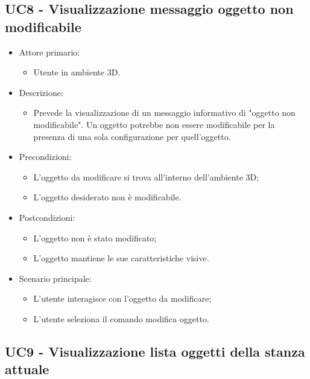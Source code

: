 \subsection{UC8 - Visualizzazione messaggio oggetto non modificabile}

\begin{itemize}

	\item Attore primario: 
	\begin{itemize}
		\item Utente in ambiente 3D.
	\end{itemize}
	\item Descrizione:
	\begin{itemize}
		\item Prevede la visualizzazione di un messaggio informativo di "oggetto non modificabile".
\newline Un oggetto potrebbe non essere modificabile per la presenza di una sola configurazione per quell'oggetto.
	\end{itemize}
	
	\item Precondizioni:
	\begin{itemize}
		\item L'oggetto da modificare si trova all'interno dell'ambiente 3D;
		\item L'oggetto desiderato non è modificabile.
	\end{itemize}
	
	\item Postcondizioni:
	\begin{itemize}
		\item L'oggetto non è stato modificato;
		\item L'oggetto mantiene le sue caratteristiche visive.
	\end{itemize}
	
	\item Scenario principale:
	\begin{itemize}
		\item L'utente interagisce con l'oggetto da modificare;
		\item L'utente seleziona il comando modifica oggetto.
	\end{itemize}
	
\end{itemize}

\pagebreak

\subsection{UC9 - Visualizzazione lista oggetti della stanza attuale}


